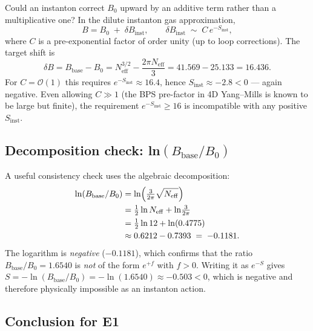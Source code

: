 \documentclass[11pt,a4paper]{article}
\theoremstyle{definition}
\theoremstyle{remark}
\begin{document}
Could an instanton correct $B_0$ upward by an additive term rather than a multiplicative one?
In the dilute instanton gas approximation,
\begin{equation}
  B = B_0 \;+\; \delta B_{\mathrm{inst}},
  \qquad
  \delta B_{\mathrm{inst}} \;\sim\; C\,e^{-S_{\mathrm{inst}}},
  \label{eq:instanton_additive}
\end{equation}
where $C$ is a pre-exponential factor of order unity (up to loop corrections).
The target shift is
\begin{equation}
  \delta B = B_{\mathrm{base}} - B_0
    = N_{\mathrm{eff}}^{3/2} - \frac{2\pi N_{\mathrm{eff}}}{3}
    = 41.569 - 25.133
    = 16.436.
  \label{eq:instanton_shift}
\end{equation}
For $C = \mathcal{O}(1)$ this requires $e^{-S_{\mathrm{inst}}} \approx 16.4$, hence
$S_{\mathrm{inst}} \approx -2.8 < 0$ — again negative.
Even allowing $C \gg 1$ (the BPS pre-factor in 4D Yang--Mills is known to
be large but finite), the requirement $e^{-S_{\mathrm{inst}}} \geq 16$ is incompatible
with any positive $S_{\mathrm{inst}}$.

\subsection{Decomposition check: ln$(B_{\mathrm{base}}/B_0)$}

A useful consistency check uses the algebraic decomposition:
\begin{align}
  \ln(B_{\mathrm{base}}/B_0)
    &= \ln\!\left(\tfrac{3}{2\pi}\sqrt{N_{\mathrm{eff}}}\right) \notag \\
    &= \tfrac{1}{2}\ln N_{\mathrm{eff}} + \ln\!\tfrac{3}{2\pi} \notag \\
    &= \tfrac{1}{2}\ln 12 + \ln(0.4775) \notag \\
    &\approx 0.6212 - 0.7393 \;=\; -0.1181.
  \label{eq:log_ratio_decomp}
\end{align}
The logarithm is \emph{negative} ($-0.1181$), which confirms that the ratio
$B_{\mathrm{base}}/B_0 = 1.6540$ is \emph{not} of the form $e^{+f}$ with $f > 0$.
Writing it as $e^{-S}$ gives $S = -\ln(B_{\mathrm{base}}/B_0) = -\ln(1.6540) \approx -0.503 < 0$,
which is negative and therefore physically impossible as an instanton action.

\subsection{Conclusion for E1}
\end{document}
